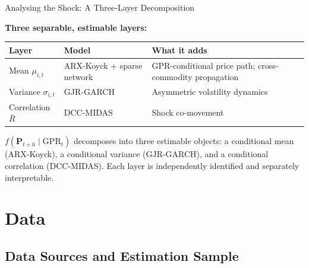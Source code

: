 ﻿\documentclass[aspectratio=1610]{beamer}
\begin{document}
\begin{frame}[shrink=15]{Analysing the Shock: A Three-Layer Decomposition}

  \medskip
  \textbf{Three separable, estimable layers:}

  \medskip
  \begin{tabular}{llp{4.5cm}}
    \toprule
    Layer & Model & What it adds \\
    \midrule
    Mean $\mu_{i,t}$        & ARX-Koyck + sparse network & GPR-conditional price path; cross-commodity propagation\\
    Variance $\sigma_{i,t}$ & GJR-GARCH  & Asymmetric volatility dynamics\\
    Correlation $\bar{R}$   & DCC-MIDAS  & Shock co-movement\\
    \bottomrule
  \end{tabular}

  \medskip
  \begin{alertblock}{}
    $f(\mathbf{P}_{t+h} \mid \mathrm{GPR}_t)$ decomposes into three estimable
    objects: a conditional mean (ARX-Koyck), a conditional variance
    (GJR-GARCH), and a conditional correlation (DCC-MIDAS). Each layer is
    independently identified and separately interpretable.
  \end{alertblock}

\end{frame}

\section{Data}

\subsection{Data Sources and Estimation Sample}
\end{document}
